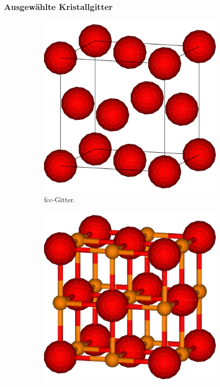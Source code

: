 \subsubsection{Ausgewählte Kristallgitter}\label{subsubsec:kristallgitter}
\begin{figure}
    \centering
    \begin{subfigure}[t]{0.3\textwidth}
        \centering
        \includegraphics[width=\textwidth]{../assets/theorie/fcc}
        \caption{fcc-Gitter.} \label{fcc}
    \end{subfigure}
    \begin{subfigure}[t]{0.3\textwidth}
        \centering
        \includegraphics[width=\textwidth]{../assets/theorie/rocksalt}

\end{subfigure}
\end{figure}
